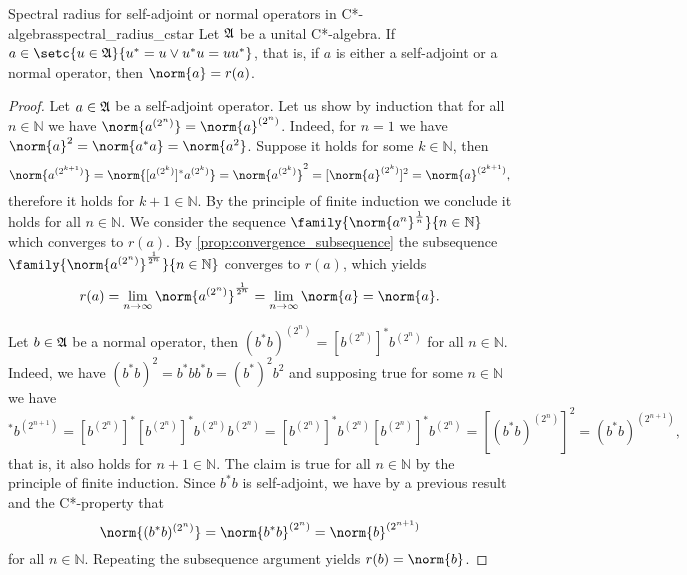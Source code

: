 \begin{theorem}{Spectral radius for self-adjoint or normal operators in C*-algebras}{spectral_radius_cstar}
    Let \(\mathfrak{A}\) be a unital C*-algebra. If \(a \in \setc{u \in \algebra{A}}{u^* = u \lor u^*u = uu^*}\), that is, if \(a\) is either a self-adjoint or a normal operator, then \(\norm{a} = r(a)\).
\end{theorem}
\begin{proof}
    Let \(a \in \mathfrak{A}\) be a self-adjoint operator. Let us show by induction that for all \(n \in \mathbb{N}\) we have \(\norm{a^{(2^n)}} = \norm{a}^{(2^n)}\). Indeed, for \(n = 1\) we have \(\norm{a}^2 = \norm{a^*a} = \norm{a^2}\). Suppose it holds for some \(k \in \mathbb{N}\), then
    \begin{equation*}
        \norm{a^{(2^{k+1})}} = \norm{[a^{(2^k)}]^*a^{(2^k)}}= \norm{a^{(2^k)}}^2 = [\norm{a}^{(2^k)}]^2 = \norm{a}^{(2^{k+1})},
    \end{equation*}
    therefore it holds for \(k + 1 \in \mathbb{N}\). By the principle of finite induction we conclude it holds for all \(n \in \mathbb{N}\). We consider the sequence \(\family{\norm{a^n}^{\frac1n}}{n \in \mathbb{N}}\) which converges to \(r(a)\). By \cref{prop:convergence_subsequence} the subsequence \(\family{\norm{a^{(2^n)}}^{\frac1{2^n}}}{n \in \mathbb{N}}\) converges to \(r(a)\), which yields
    \begin{equation*}
        r(a) = \lim_{n \to \infty}{\norm{a^{(2^n)}}^{\frac1{2^n}}} = \lim_{n\to\infty}{\norm{a}} = \norm{a}.
    \end{equation*}

    Let \(b \in \mathfrak{A}\) be a normal operator, then \((b^*b)^{(2^{n})} = [b^{(2^n)}]^*b^{(2^n)}\) for all \(n \in \mathbb{N}\). Indeed, we have \((b^*b)^2 = b^*bb^*b = (b^*)^2 b^2\) and supposing true for some \(n \in \mathbb{N}\) we have
    \begin{equation*}
        [b^{(2^{n+1})}]^* b^{(2^{n+1})} = [b^{(2^n)}]^* [b^{(2^n)}]^* b^{(2^n)} b^{(2^n)} = [b^{(2^n)}]^*  b^{(2^n)} [b^{(2^n)}]^*b^{(2^n)} = [(b^*b)^{(2^n)}]^2 = (b^*b)^{(2^{n+1})},
    \end{equation*}
    that is, it also holds for \(n + 1 \in \mathbb{N}\). The claim is true for all \(n \in \mathbb{N}\) by the principle of finite induction. Since \(b^*b\) is self-adjoint, we have by a previous result and the C*-property that
    \begin{equation*}
        \norm{(b^*b)^{(2^n)}}= \norm{b^*b}^{(2^n)} = \norm{b}^{(2^{n+1})}
    \end{equation*}
    for all \(n \in \mathbb{N}.\) Repeating the subsequence argument yields \(r(b) = \norm{b}\).
\end{proof}
